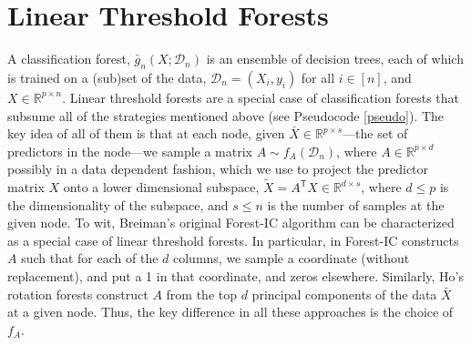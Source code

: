 \documentclass{article} %
\newcommand{\jovo}[1]{{\color{magenta}{\it jovo says: #1}}}
\newcommand{\Real}{\mathbb{R}}
\providecommand{\mc}[1]{\mathcal{#1}}
\providecommand{\mt}[1]{\widetilde{#1}}
\newcommand{\T}{^{\ensuremath{\mathsf{T}}}}           %
\begin{document}



\section{Linear Threshold Forests}

A classification forest, $\bar{g}_n(X; \mc{D}_n)$ is an ensemble of decision trees, each of which is trained on a (sub)set of the data, $\mc{D}_n=(X_i,y_i)$ for all $i \in [n]$, and $X \in \Real^{p \times n}$. Linear threshold forests are a special case of classification forests that subsume all of the strategies mentioned above (see Pseudocode \ref{pseudo}).  The key idea of all of them is that at each node, given $\bar{X} \in \Real^{p \times s}$---the set of predictors in the node---we sample a  matrix $A \sim f_A(\mc{D}_n)$, where $A \in \Real^{p \times d}$ possibly in a data dependent fashion, which we use to project the predictor matrix $X$ onto a lower dimensional subspace, $\mt{X} = A\T X \in \Real^{d \times s}$, where $d \leq p$ is the dimensionality of the subspace, and $s \leq n$ is the number of samples at the given node.  To wit, Breiman's original Forest-IC algorithm can be characterized as a special case of linear threshold forests.  In particular, in Forest-IC constructs $A$ such that for each of the $d$ columns, we sample a coordinate (without replacement), and put a 1 in that coordinate, and zeros elsewhere. Similarly, Ho's rotation forests construct $A$ from the top $d$ principal components of the data $\bar{X}$ at a given node.  Thus, the key difference in all these approaches is the choice of $f_A$. 
\end{document}
